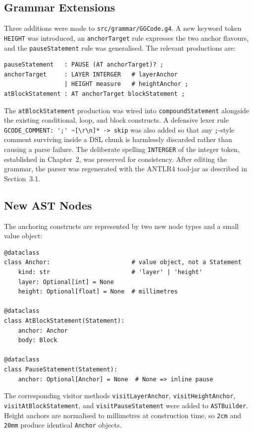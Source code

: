 \subsection*{Grammar Extensions}

Three additions were made to \texttt{src/grammar/GGCode.g4}. A new keyword token \texttt{HEIGHT} was introduced, an \texttt{anchorTarget} rule expresses the two anchor flavours, and the \texttt{pauseStatement} rule was generalised. The relevant productions are:

\begin{verbatim}
pauseStatement   : PAUSE (AT anchorTarget)? ;
anchorTarget     : LAYER INTERGER   # layerAnchor
                 | HEIGHT measure   # heightAnchor ;
atBlockStatement : AT anchorTarget blockStatement ;
\end{verbatim}

The \texttt{atBlockStatement} production was wired into \texttt{compoundStatement} alongside the existing conditional, loop, and block constructs. A defensive lexer rule \verb|GCODE_COMMENT: ';' ~[\r\n]* -> skip| was also added so that any \texttt{;}-style comment surviving inside a DSL chunk is harmlessly discarded rather than causing a parse failure. The deliberate spelling \texttt{INTERGER} of the integer token, established in Chapter~2, was preserved for consistency. After editing the grammar, the parser was regenerated with the ANTLR4 tool-jar as described in Section~3.1.

\subsection*{New AST Nodes}

The anchoring constructs are represented by two new node types and a small value object:

\begin{verbatim}
@dataclass
class Anchor:                       # value object, not a Statement
    kind: str                       # 'layer' | 'height'
    layer: Optional[int] = None
    height: Optional[float] = None  # millimetres

@dataclass
class AtBlockStatement(Statement):
    anchor: Anchor
    body: Block

@dataclass
class PauseStatement(Statement):
    anchor: Optional[Anchor] = None  # None => inline pause
\end{verbatim}

The corresponding visitor methods \texttt{visitLayerAnchor}, \texttt{visitHeightAnchor}, \texttt{visitAtBlockStatement}, and \texttt{visitPauseStatement} were added to \texttt{ASTBuilder}. Height anchors are normalised to millimetres at construction time, so \texttt{2cm} and \texttt{20mm} produce identical \texttt{Anchor} objects.

